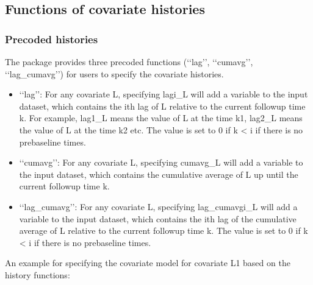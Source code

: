 \documentclass[letterpaper,10pt,english]{sphinxmanual}
\begin{document}
\subsection{Functions of covariate histories}
\label{\detokenize{Specifications/Covariate model:functions-of-covariate-histories}}

\subsubsection{Pre\sphinxhyphen{}coded histories}
\label{\detokenize{Specifications/Covariate model:pre-coded-histories}}
\sphinxAtStartPar
The package provides three pre\sphinxhyphen{}coded functions (‘‘lag’’, ‘‘cumavg’’, ‘‘lag\_cumavg’’) for users to specify the covariate histories.
\begin{itemize}
\item {} 
\sphinxAtStartPar
‘‘lag’’: For any covariate L, specifying lagi\_L will add a variable to the input dataset, which contains the ith lag of L relative to the
current follow\sphinxhyphen{}up time k. For example, lag1\_L means the value of L at the time k\sphinxhyphen{}1,
lag2\_L means the value of L at the time k\sphinxhyphen{}2 etc. The value is set to 0 if k \textless{} i if there is no pre\sphinxhyphen{}baseline times.

\item {} 
\sphinxAtStartPar
‘‘cumavg’’:  For any covariate L, specifying cumavg\_L will add a variable to the input dataset, which contains the cumulative
average of L up until the current follow\sphinxhyphen{}up time k.

\item {} 
\sphinxAtStartPar
‘‘lag\_cumavg’’: For any covariate L, specifying lag\_cumavgi\_L will add a variable to the input dataset, which contains
the ith lag of the cumulative average of L relative to the current follow\sphinxhyphen{}up time k. The value is set to 0 if k \textless{} i
if there is no pre\sphinxhyphen{}baseline times.

\end{itemize}

\sphinxAtStartPar
An example for specifying the covariate model for covariate L1 based on the history functions:

\begin{sphinxVerbatim}[commandchars=\\\{\}]
          
\end{sphinxVerbatim}
\end{document}
